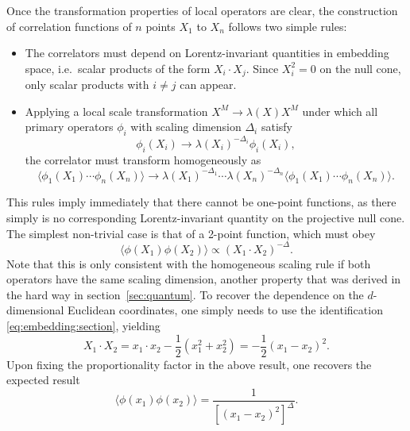 \documentclass[a4paper,12pt]{article}
\numberwithin{equation}{section}
\begin{document}
Once the transformation properties of local operators are clear, the construction of correlation functions of $n$ points $X_1$ to $X_n$ follows two simple rules:
\begin{itemize}

\item
The correlators must depend on Lorentz-invariant quantities in embedding space, i.e.~scalar products of the form $X_i \cdot X_j$. Since $X_i^2 = 0$ on the null cone, only scalar products with $i \neq j$ can appear.

\item
Applying a local scale transformation $X^M \to \lambda(X) X^M$ under which all primary operators $\phi_i$ with scaling dimension $\Delta_i$ satisfy
\begin{equation}
	\phi_i(X_i) \to \lambda(X_i)^{-\Delta_i} \phi_i(X_i),
\end{equation} 
the correlator must transform homogeneously as
\begin{equation}
	\langle \phi_1(X_1) \cdots \phi_n(X_n) \rangle
	\to \lambda(X_1)^{-\Delta_1} \cdots \lambda(X_n)^{-\Delta_n}
	\langle \phi_1(X_1) \cdots \phi_n(X_n) \rangle.
\end{equation}


\end{itemize}
%
This rules imply immediately that there cannot be one-point functions, as there simply is no corresponding Lorentz-invariant quantity on the projective null cone. The simplest non-trivial case is that of a 2-point function, which must obey
\begin{equation}
	\langle \phi(X_1) \phi(X_2) \rangle
	\propto (X_1 \cdot X_2)^{-\Delta}.
\end{equation}
Note that this is only consistent with the homogeneous scaling rule if both operators have the same scaling dimension, another property that was derived in the hard way in section~\ref{sec:quantum}.
To recover the dependence on the $d$-dimensional Euclidean coordinates, one simply needs to use the identification \eqref{eq:embedding:section}, yielding
\begin{equation}
	X_1 \cdot X_2
	= x_1 \cdot x_2 - \frac{1}{2} \left(x_1^2 + x_2^2 \right)
	= -\frac{1}{2} (x_1 - x_2)^2.
\end{equation}
Upon fixing the proportionality factor in the above result, one recovers the expected result
\begin{equation}
	\langle \phi(x_1) \phi(x_2) \rangle = 
	\frac{1}{\left[ (x_1 - x_2)^2 \right]^\Delta}.
\end{equation}
\end{document}
